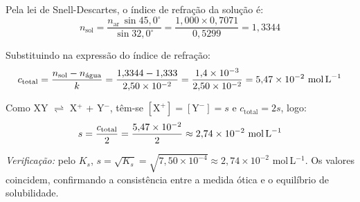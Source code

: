 \documentclass[12pt,a4paper]{article}
\begin{document}
\begin{mdframed}[style=resolucao]

Pela lei de Snell-Descartes, o \'indice de refra\c{c}\~ao da solu\c{c}\~ao \'e:
\[
  n_{\text{sol}}
  = \frac{n_{\text{ar}}\,\sin 45{,}0^\circ}{\sin 32{,}0^\circ}
  = \frac{1{,}000 \times 0{,}7071}{0{,}5299}
  = 1{,}3344
\]

Substituindo na express\~ao do \'indice de refra\c{c}\~ao:
\[
  c_{\text{total}}
  = \frac{n_{\text{sol}} - n_{\text{\'{a}gua}}}{k}
  = \frac{1{,}3344 - 1{,}333}{2{,}50 \times 10^{-2}}
  = \frac{1{,}4 \times 10^{-3}}{2{,}50 \times 10^{-2}}
  = 5{,}47 \times 10^{-2}\ \text{mol\,L}^{-1}
\]

Como XY $\rightleftharpoons$ X$^+$ + Y$^-$, t\^em-se $[\mathrm{X}^+] =
[\mathrm{Y}^-] = s$ e $c_{\text{total}} = 2s$, logo:
\[
  s = \frac{c_{\text{total}}}{2}
    = \frac{5{,}47 \times 10^{-2}}{2}
    \approx 2{,}74 \times 10^{-2}\ \text{mol\,L}^{-1}
\]

\textit{Verifica\c{c}\~ao:} pelo $K_s$,
$s = \sqrt{K_s} = \sqrt{7{,}50 \times 10^{-4}} \approx 2{,}74 \times 10^{-2}$
mol\,L$^{-1}$. Os valores coincidem, confirmando a consist\^encia entre a
medida \'otica e o equil\'ibrio de solubilidade.

\end{mdframed}
\end{document}
